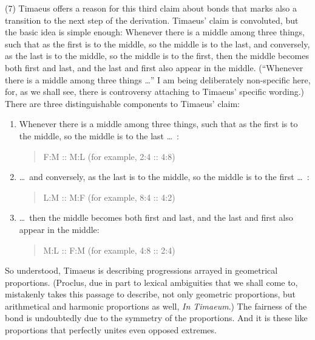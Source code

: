 (7) Timaeus offers a reason for this third claim about bonds that marks also a transition to the next step of the derivation. Timaeus' claim is convoluted, but the basic idea is simple enough: Whenever there is a middle among three things, such that as the first is to the middle, so the middle is to the last, and conversely, as the last is to the middle, so the middle is to the first, then the middle becomes both first and last, and the last and first also appear in the middle. (``Whenever there is a middle among three things \ldots'' I am being deliberately non-specific here, for, as we shall see, there is controversy attaching to Timaeus' specific wording.) There are three distinguishable components to Timaeus' claim:
\begin{enumerate}[(1)]
	\item Whenever there is a middle among three things, such that as the first is to the middle, so the middle is to the last \ldots\ :
	\begin{quote}
		F:M :: M:L (for example, 2:4 :: 4:8)
	\end{quote}
	\item \ldots\ and conversely, as the last is to the middle, so the middle is to the first \dots\ :
	\begin{quote}
		L:M :: M:F (for example, 8:4 :: 4:2)
	\end{quote}
	\item \ldots\ then the middle becomes both first and last, and the last and first also appear in the middle:
	\begin{quote}
		M:L :: F:M (for example, 4:8 :: 2:4)
	\end{quote}
\end{enumerate}
So understood, Timaeus is describing progressions arrayed in geometrical proportions. (Proclus, due in part to lexical ambiguities that we shall come to, mistakenly takes this passage to describe, not only geometric proportions, but arithmetical and harmonic proportions as well, \emph{In Timaeum}.) The fairness of the bond is undoubtedly due to the symmetry of the proportions. And it is these like proportions that perfectly unites even opposed extremes.  


